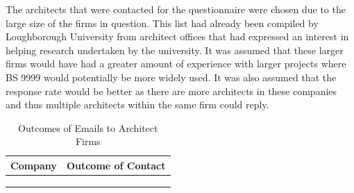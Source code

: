 \documentclass[table,a4paper,oneside]{book}
\begin{document}
The architects that were contacted for the questionnaire were chosen due to the large size of the firms in question. This list had already been compiled by Loughborough University from architect offices that had expressed an interest in helping research undertaken by the university. It was assumed that these larger firms would have had a greater amount of experience with larger projects where BS 9999 would potentially be more widely used. It was also assumed that the response rate would be better as there are more architects in these companies and thus multiple architects within the same firm could reply.

\begin{longtable}{ll}
\toprule
\textbf{Company} & \textbf{Outcome of Contact} \\
\midrule
\endhead

\bottomrule
\multicolumn{2}{c}{} \\
\caption{Outcomes of Emails to Architect Firms} \label{tab:architects} \\
\endfoot


\end{longtable}
\end{document}
